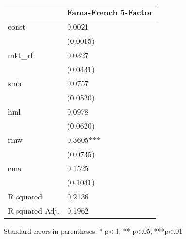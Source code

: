 \begin{table}
\caption{}
\label{}
\begin{center}
\begin{tabular}{ll}
\hline
               & Fama-French 5-Factor  \\
\hline
const          & 0.0021                \\
               & (0.0015)              \\
mkt\_rf        & 0.0327                \\
               & (0.0431)              \\
smb            & 0.0757                \\
               & (0.0520)              \\
hml            & 0.0978                \\
               & (0.0620)              \\
rmw            & 0.3605***             \\
               & (0.0735)              \\
cma            & 0.1525                \\
               & (0.1041)              \\
R-squared      & 0.2136                \\
R-squared Adj. & 0.1962                \\
\hline
\end{tabular}
\end{center}
\end{table}
\bigskip
Standard errors in parentheses. \newline 
* p<.1, ** p<.05, ***p<.01